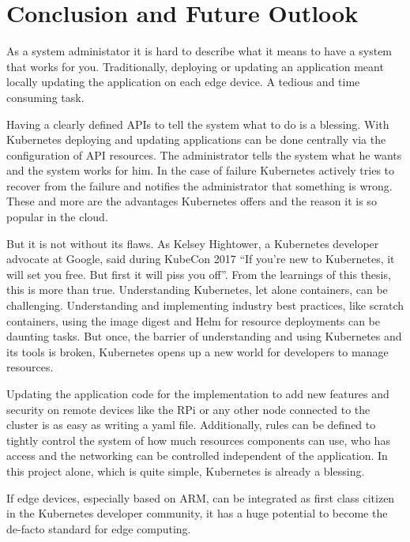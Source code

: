 \clearpage
\section{Conclusion and Future Outlook}
As a system administator it is hard to describe what it means to have a system that works for you. Traditionally, deploying or updating an application meant locally updating the application on each edge device. A tedious and time consuming task.

Having a clearly defined APIs to tell the system what to do is a blessing. With Kubernetes deploying and updating applications can be done centrally via the configuration of API resources. The administrator tells the system what he wants and the system works for him. In the case of failure Kubernetes actively tries to recover from the failure and notifies the administrator that something is wrong. These and more are the advantages Kubernetes offers and the reason it is so popular in the cloud.

But it is not without its flaws. As Kelsey Hightower, a Kubernetes developer advocate at Google, said during KubeCon 2017 ``If you’re new to Kubernetes, it will set you free. But first it will piss you off''\cite{KubernetesPissYouOff:online}. From the learnings of this thesis, this is more than true. Understanding Kubernetes, let alone containers, can be challenging. Understanding and implementing industry best practices, like scratch containers, using the image digest and Helm for resource deployments can be daunting tasks. But once, the barrier of understanding and using Kubernetes and its tools is broken, Kubernetes opens up a new world for developers to manage resources.

Updating the application code for the implementation to add new features and security on remote devices like the RPi or any other node connected to the cluster is as easy as writing a yaml file. Additionally, rules can be defined to tightly control the system of how much resources components can use, who has access and the networking can be controlled independent of the application. In this project alone, which is quite simple, Kubernetes is already a blessing.  


If edge devices, especially based on ARM, can be integrated as first class citizen in the Kubernetes developer community, it has a huge potential to become the de-facto standard for edge computing.\\[5mm]

{}

